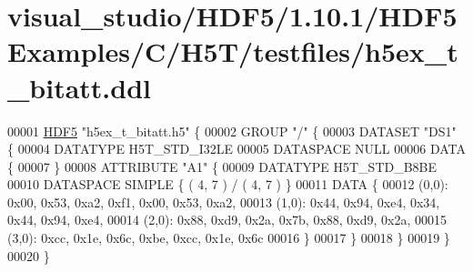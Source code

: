 \hypertarget{visual__studio_2_h_d_f5_21_810_81_2_h_d_f5_examples_2_c_2_h5_t_2testfiles_2h5ex__t__bitatt_8ddl_source}{}\section{visual\+\_\+studio/\+H\+D\+F5/1.10.1/\+H\+D\+F5\+Examples/\+C/\+H5\+T/testfiles/h5ex\+\_\+t\+\_\+bitatt.ddl}
\label{visual__studio_2_h_d_f5_21_810_81_2_h_d_f5_examples_2_c_2_h5_t_2testfiles_2h5ex__t__bitatt_8ddl_source}

\begin{DoxyCode}
00001 \hyperlink{namespace_h_d_f5}{HDF5} \textcolor{stringliteral}{"h5ex\_t\_bitatt.h5"} \{
00002 GROUP \textcolor{stringliteral}{"/"} \{
00003    DATASET \textcolor{stringliteral}{"DS1"} \{
00004       DATATYPE  H5T\_STD\_I32LE
00005       DATASPACE  NULL
00006       DATA \{
00007       \}
00008       ATTRIBUTE \textcolor{stringliteral}{"A1"} \{
00009          DATATYPE  H5T\_STD\_B8BE
00010          DATASPACE  SIMPLE \{ ( 4, 7 ) / ( 4, 7 ) \}
00011          DATA \{
00012          (0,0): 0x00, 0x53, 0xa2, 0xf1, 0x00, 0x53, 0xa2,
00013          (1,0): 0x44, 0x94, 0xe4, 0x34, 0x44, 0x94, 0xe4,
00014          (2,0): 0x88, 0xd9, 0x2a, 0x7b, 0x88, 0xd9, 0x2a,
00015          (3,0): 0xcc, 0x1e, 0x6c, 0xbe, 0xcc, 0x1e, 0x6c
00016          \}
00017       \}
00018    \}
00019 \}
00020 \}
\end{DoxyCode}
